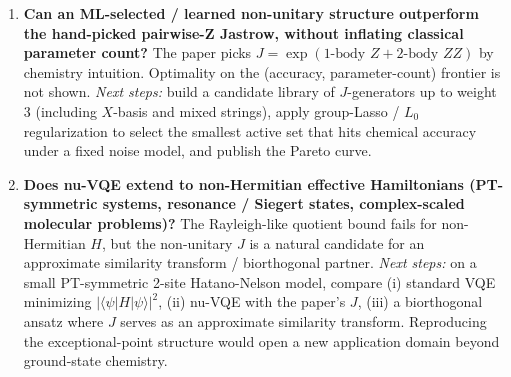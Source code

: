 \begin{enumerate}
\item \textbf{Can an ML-selected / learned non-unitary structure outperform
the hand-picked pairwise-Z Jastrow, without inflating classical parameter
count?}
The paper picks $J = \exp(\text{1-body } Z + \text{2-body } ZZ)$ by
chemistry intuition. Optimality on the (accuracy, parameter-count) frontier
is not shown.
\emph{Next steps:} build a candidate library of $J$-generators up to
weight 3 (including $X$-basis and mixed strings), apply group-Lasso / $L_0$
regularization to select the smallest active set that hits chemical
accuracy under a fixed noise model, and publish the Pareto curve.

\item \textbf{Does nu-VQE extend to non-Hermitian effective Hamiltonians
(PT-symmetric systems, resonance / Siegert states, complex-scaled
molecular problems)?}
The Rayleigh-like quotient bound fails for non-Hermitian $H$, but the
non-unitary $J$ is a natural candidate for an approximate similarity
transform / biorthogonal partner.
\emph{Next steps:} on a small PT-symmetric 2-site Hatano-Nelson model,
compare (i) standard VQE minimizing $|\langle\psi|H|\psi\rangle|^2$,
(ii) nu-VQE with the paper's $J$, (iii) a biorthogonal ansatz where $J$
serves as an approximate similarity transform. Reproducing the
exceptional-point structure would open a new application domain beyond
ground-state chemistry.

\end{enumerate}
